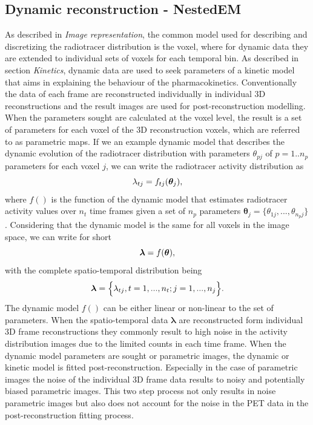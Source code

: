 \subsection{Dynamic reconstruction - NestedEM}
As described in \textit{Image representation}, the common model used for describing and discretizing the radiotracer distribution is the voxel, where for dynamic data they are extended to individual sets of voxels for each temporal bin. 
As described in section \textit{Kinetics}, dynamic data are used to seek parameters of a kinetic model that aims in explaining the behaviour of the pharmacokinetics. Conventionally the data of each frame are reconstructed individually in individual 3D reconstructions and the result images are used for post-reconstruction modelling. When the parameters sought are calculated at the voxel level, the result is a set of parameters for each voxel of the 3D reconstruction voxels, which are referred to as parametric maps. If we an example dynamic model that describes the dynamic evolution of the radiotracer distribution with parameters $\theta_{pj}$ of $p=1..n_p$ parameters for each voxel $j$, we can write the radiotracer activity distribution as 
\begin{equation}
   \lambda_{tj} = f_{tj}(\bm\theta_{j}) \\,
\end{equation}
where $f()$ is the function of the dynamic model that estimates radiotracer activity values over $n_t$ time frames given a set of $n_{p}$ parameters $\bm\theta_{j} =  \Big\{\theta_{1j},...,\theta_{n_{p}j} \Big\}$.
Considering that the dynamic model is the same for all voxels in the image space, we can write for short 
\begin{equation}
\bm\lambda = f(\bm\theta) \\, 
\end{equation}
with the complete spatio-temporal distribution being 
\begin{equation}
   \bm{\lambda} = \Big\{ {{\lambda}_{tj},t=1,...,n_t ; j=1,...,n_j} \Big\} \\. 
\end{equation}
The dynamic model $f()$ can be either linear or non-linear to the set of parameters. 
When the spatio-temporal data $\bm{\lambda}$ are reconstructed form individual 3D frame reconstructions they commonly result to high noise in the activity distribution images due to the limited counts in each time frame. When  the dynamic model parameters are sought or parametric images, the dynamic or kinetic model is fitted post-reconstruction. Especially in the case of parametric images the noise of the individual 3D frame data results to noisy and potentially biased parametric images. This two step process not only results in noise parametric images but also does not account for the noise in the PET data in the post-reconstruction fitting process. 
